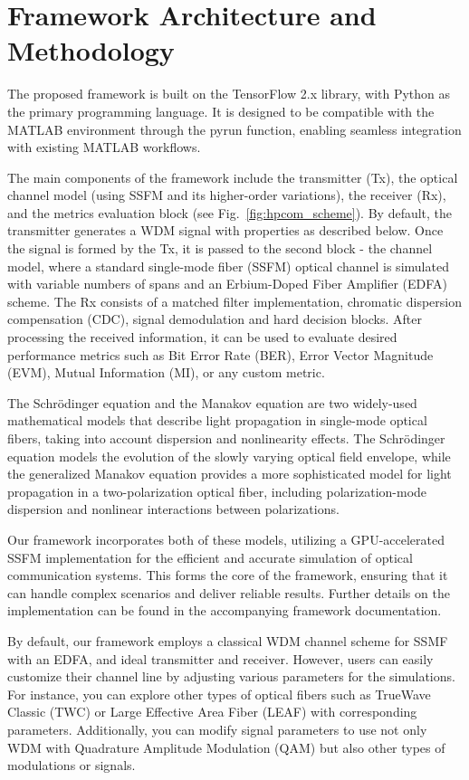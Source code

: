 \section{Framework Architecture and Methodology}
The proposed framework is built on the TensorFlow 2.x library, with Python as the primary programming language. It is designed to be compatible with the MATLAB environment through the \textrm{pyrun} function, enabling seamless integration with existing MATLAB workflows.

The main components of the framework include the transmitter (Tx), the optical channel model (using SSFM and its higher-order variations), the receiver (Rx), and the metrics evaluation block (see Fig.~\ref{fig:hpcom_scheme}). By default, the transmitter generates a WDM signal with properties as described below. Once the signal is formed by the Tx, it is passed to the second block - the channel model, where a standard single-mode fiber (SSFM) optical channel is simulated with variable numbers of spans and an Erbium-Doped Fiber Amplifier (EDFA) scheme. The Rx consists of a matched filter implementation, chromatic dispersion compensation (CDC), signal demodulation and hard decision blocks. After processing the received information, it can be used to evaluate desired performance metrics such as Bit Error Rate (BER), Error Vector Magnitude (EVM), Mutual Information (MI), or any custom metric.

The Schr\"odinger equation and the Manakov equation are two widely-used mathematical models that describe light propagation in single-mode optical fibers, taking into account dispersion and nonlinearity effects\cite{agrawal2000nonlinear}. The Schr\"odinger equation models the evolution of the slowly varying optical field envelope, while the generalized Manakov equation provides a more sophisticated model for light propagation in a two-polarization optical fiber, including polarization-mode dispersion and nonlinear interactions between polarizations\cite{poletti2008description, mumtaz2012nonlinear}.

Our framework incorporates both of these models, utilizing a GPU-accelerated SSFM implementation for the efficient and accurate simulation of optical communication systems. This forms the core of the framework, ensuring that it can handle complex scenarios and deliver reliable results. Further details on the implementation can be found in the accompanying framework documentation\cite{esf0_2023_7880552}.

By default, our framework employs a classical WDM channel scheme for SSMF with an EDFA\cite{essiambre2010capacity}, and ideal transmitter and receiver. However, users can easily customize their channel line by adjusting various parameters for the simulations. For instance, you can explore other types of optical fibers such as TrueWave Classic\cite{taylor2002application} (TWC) or Large Effective Area Fiber\cite{charlet200972} (LEAF) with corresponding parameters. Additionally, you can modify signal parameters to use not only WDM with Quadrature Amplitude Modulation (QAM) but also other types of modulations or signals.

